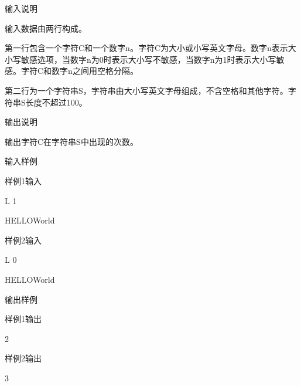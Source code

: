 输入说明	

输入数据由两行构成。

第一行包含一个字符C和一个数字n。字符C为大小或小写英文字母。数字n表示大小写敏感选项，当数字n为0时表示大小写不敏感，当数字n为1时表示大小写敏感。字符C和数字n之间用空格分隔。

第二行为一个字符串S，字符串由大小写英文字母组成，不含空格和其他字符。字符串S长度不超过100。

输出说明
	
输出字符C在字符串S中出现的次数。

输入样例

样例1输入

L 1

HELLOWorld

样例2输入

L 0

HELLOWorld

输出样例

样例1输出	

2

样例2输出

3

